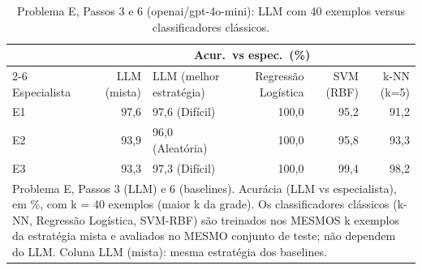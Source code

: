 \begin{table}[htbp]
\centering
\small
\caption{Problema E, Passos 3 e 6 (openai/gpt-4o-mini): LLM com 40 exemplos versus classificadores clássicos.}
\label{tab:bloco2_E_passo6_baselines_gpt4mini}
\begin{tabular}{lrlrrr}
\toprule
 & \multicolumn{5}{c}{Acur.\ vs espec.\ (\%)} \\ \cmidrule(lr){2-6}
Especialista & LLM (mista) & LLM (melhor estratégia) & Regressão Logística & SVM (RBF) & k-NN (k=5) \\
\midrule
E1 & 97,6 & 97,6 (Difícil) & 100,0 & 95,2 & 91,2 \\
E2 & 93,9 & 96,0 (Aleatória) & 100,0 & 95,8 & 93,3 \\
E3 & 93,3 & 97,3 (Difícil) & 100,0 & 99,4 & 98,2 \\
\bottomrule
\multicolumn{6}{p{0.95\linewidth}}{\footnotesize Problema E, Passos 3 (LLM) e 6 (baselines). Acurácia (LLM vs especialista), em \%, com k = 40 exemplos (maior k da grade). Os classificadores clássicos (k-NN, Regressão Logística, SVM-RBF) são treinados nos MESMOS k exemplos da estratégia mista e avaliados no MESMO conjunto de teste; não dependem do LLM. Coluna LLM (mista): mesma estratégia dos baselines.} \\
\end{tabular}
\end{table}
